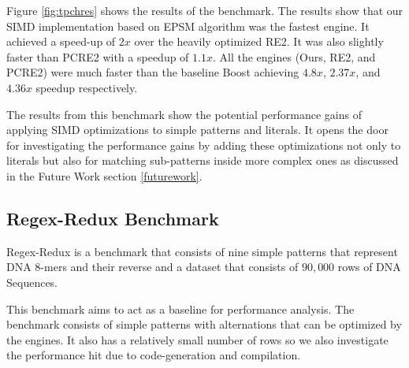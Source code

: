 Figure \ref{fig:tpchres} shows the results of the benchmark. The results show that our SIMD implementation based on EPSM algorithm was the fastest engine. It achieved a speed-up of $2x$ over the heavily optimized RE2. It was also slightly faster than PCRE2 with a speedup of $1.1x$. All the engines (Ours, RE2, and PCRE2) were much faster than the baseline Boost achieving $4.8x$, $2.37x$, and $4.36x$ speedup respectively.

The results from this benchmark show the potential performance gains of applying SIMD optimizations to simple patterns and literals. It opens the door for investigating the performance gains by adding these optimizations not only to literals but also for matching sub-patterns inside more complex ones as discussed in the Future Work section \ref{futurework}.

\subsection{Regex-Redux Benchmark}\label{regexredux}
Regex-Redux \cite{regexredux} is a benchmark that consists of nine simple patterns that represent DNA 8-mers and their reverse and a dataset that consists of $90,000$ rows of DNA Sequences.

This benchmark aims to act as a baseline for performance analysis. The benchmark consists of simple patterns with alternations that can be optimized by the engines. It also has a relatively small number of rows so we also investigate the performance hit due to code-generation and compilation.

